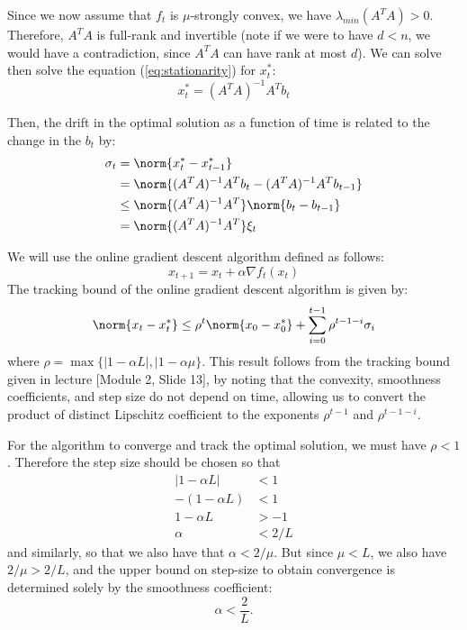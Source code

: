 \documentclass{homework}
\begin{document}
\begin{letterenum}
        Since we now assume that $f_t$ is $\mu$-strongly convex, we have
        $\lambda_{min} (A^TA) > 0$. Therefore, $A^TA$ is full-rank and
        invertible (note if we were to have $d < n$, we would have a contradiction,
        since $A^TA$ can have rank at most $d$). We can solve then solve the
        equation (\ref{eq:stationarity}) for $x_t^*$:
        \begin{equation*}
            x_t^* = (A^TA)^{-1} A^Tb_t
        \end{equation*}

        Then, the drift in the optimal solution as a function of time is related
        to the change in the $b_t$ by:
        \begin{align*}
            \sigma_t &= \norm{x_t^* - x_{t-1}^*} \\
                &= \norm{(A^TA)^{-1}A^T b_t - (A^TA)^{-1} A^T b_{t-1}} \\
                &\leq \norm{(A^TA)^{-1} A^T} \norm{b_t - b_{t-1}} \\
                &= \norm{(A^TA)^{-1} A^T} \xi_t
        \end{align*}

    \item We will use the online gradient descent algorithm defined as follows:
    \begin{equation}
        x_{t+1} = x_t + \alpha \nabla f_t(x_t)
    \end{equation}
    The tracking bound of the online gradient descent algorithm is given
    by:
    \begin{equation*}
        \norm{x_t - x_t^*} \leq \rho^t \norm{x_0 - x_0^*}
            + \sum_{i=0}^{t-1} \rho^{t - 1 - i} \sigma_i \\
    \end{equation*}
    where $\rho = \max\{|1 - \alpha L|, |1 - \alpha \mu\}$. This result follows
    from the tracking bound given in lecture [Module 2, Slide 13], by noting that
    the convexity, smoothness coefficients, and step size do not depend on time,
    allowing us to convert the product of distinct Lipschitz coefficient to the
    exponents $\rho^{t-1}$ and $\rho^{t-1-i}$.

    For the algorithm to converge and track the optimal solution, we must
    have $\rho < 1$. Therefore the step size should be chosen so that
    \begin{align*}
        | 1 - \alpha L | &< 1 \\
        -(1 - \alpha L) &< 1 \\
        1 - \alpha L &> -1 \\
        \alpha &< 2 / L
    \end{align*}
    and similarly, so that we also have that $\alpha < 2 / \mu$.
    But since $\mu < L$, we
    also have $2 / \mu > 2 / L$, and the upper bound on step-size to obtain
    convergence is determined solely by the smoothness coefficient:
    \begin{equation*}
        \alpha < \frac{2}{L}.
    \end{equation*}


\end{letterenum}
\end{document}
